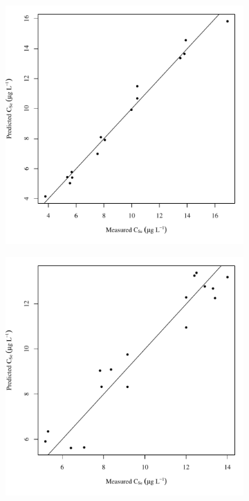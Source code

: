 \subfiguretop
\begin{landscape}
	\begin{figure}
		\begin{subfigure}{0.7\textwidth}
			\centering
			\includegraphics[width=\tableCustomSize]{"Figures/Results_USR/Stochastic/Conc Model pred v meas U163"}
		\end{subfigure}%
		\begin{subfigure}{0.7\textwidth}
			\centering
			\includegraphics[width=\tableCustomSize]{"Figures/Results_USR/Stochastic/Conc Model pred v meas U201"}

\end{subfigure}
\end{figure}
\end{landscape}
